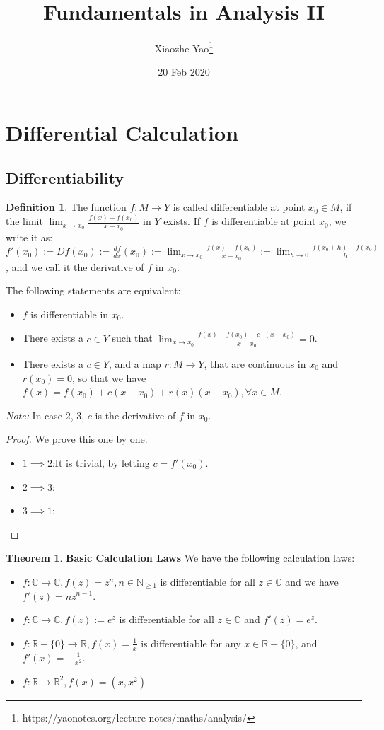 \documentclass{article}
\title{Fundamentals in Analysis II}
\author{Xiaozhe Yao\footnote{https://yaonotes.org/lecture-notes/maths/analysis/}}
\date{20 Feb 2020}
\theoremstyle{definition}
\newtheorem{defi}{Definition}[section]
\newtheorem{theorem}{Theorem}[section]
\begin{document}
\maketitle
\section{Differential Calculation}
\subsection{Differentiability}
\begin{defi}
The function $f:M\to Y$ is called differentiable at point $x_0\in M$, if the limit $\lim_{x\to x_0}\frac{f(x)-f(x_0)}{x-x_0}$ in $Y$ exists. If $f$ is differentiable at point $x_0$, we write it as: $f'(x_0):=Df(x_0) := \frac{df}{dx}(x_0) := \lim_{x\to x_0}\frac{f(x)-f(x_0)}{x-x_0} := \lim_{h\to 0}\frac{f(x_0+h)-f(x_0)}{h}$, and we call it the derivative of $f$ in $x_0$.
\end{defi}
\begin{prop}
The following statements are equivalent:
\begin{itemize}
    \item $f$ is differentiable in $x_0$.
    \item There exists a $c\in Y$ such that $\lim_{x\to x_0}\frac{f(x)-f(x_0)-c\cdot (x-x_0)}{x-x_0}=0$.
    \item There exists a $c\in Y$, and a map $r: M\to Y$, that are continuous in $x_0$ and $r(x_0)=0$, so that we have $f(x)=f(x_0)+c(x-x_0)+r(x)(x-x_0), \forall x\in M$.
\end{itemize}
\end{prop}
\textit{Note:} In case $2$, $3$, $c$ is the derivative of $f$ in $x_0$.
\begin{proof} We prove this one by one.
\begin{itemize}
    \item $1\implies 2$:It is trivial, by letting $c=f'(x_0)$.
    \item $2\implies 3$:
    \item $3\implies 1$:
\end{itemize}
\end{proof}
\begin{theorem}
\textbf{Basic Calculation Laws}
We have the following calculation laws:
\begin{itemize}
    \item $f: \mathbb{C}\to\mathbb{C}, f(z)=z^{n}, n\in\mathbb{N}_{\geq1}$ is differentiable for all $z\in\mathbb{C}$ and we have $f'(z)=nz^{n-1}$.
    \item $f:\mathbb{C}\to\mathbb{C}, f(z):=e^{z}$ is differentiable for all $z\in\mathbb{C}$ and $f'(z)=e^z$.
    \item $f: \mathbb{R}-\{0\}\to\mathbb{R}, f(x)=\frac{1}{x}$ is differentiable for any $x\in\mathbb{R}-\{0\}$, and $f'(x)=-\frac{1}{x^2}$.
    \item $f: \mathbb{R}\to\mathbb{R}^{2}, f(x)=(x, x^2)$ 
\end{itemize}
\end{theorem}
\end{document}

